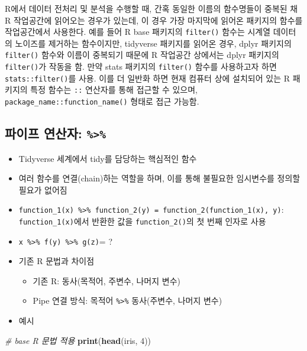 \documentclass[
  11pt,
]{krantz}
\newenvironment{Shaded}{\begin{snugshade}}{\end{snugshade}}
\newcommand{\CommentTok}[1]{\textcolor[rgb]{0.37,0.37,0.37}{\textit{#1}}}
\newcommand{\DecValTok}[1]{\textcolor[rgb]{0.06,0.06,0.06}{#1}}
\newcommand{\KeywordTok}[1]{\textcolor[rgb]{0.27,0.27,0.27}{\textbf{#1}}}
\newcommand{\NormalTok}[1]{#1}
\providecommand{\tightlist}{%
  \setlength{\itemsep}{0pt}\setlength{\parskip}{0pt}}
\let\BeginKnitrBlock\begin \let\EndKnitrBlock\end
\begin{document}
\footnotesize

\BeginKnitrBlock{rmdtip}
R에서 데이터 전처리 및 분석을 수행할 때, 간혹 동일한 이름의 함수명들이 중복된 채 R 작업공간에 읽어오는 경우가 있는데, 이 경우 가장 마지막에 읽어온 패키지의 함수를 작업공간에서 사용한다. 예를 들어 R base 패키지의 \texttt{filter()} 함수는 시계열 데이터의 노이즈를 제거하는 함수이지만, tidyverse 패키지를 읽어온 경우, dplyr 패키지의 \texttt{filter()} 함수와 이름이 중복되기 때문에 R 작업공간 상에서는 dplyr 패키지의 \texttt{filter()}가 작동을 함. 만약 stats 패키지의 \texttt{filter()} 함수를 사용하고자 하면 \texttt{stats::filter()}를 사용. 이를 더 일반화 하면 현재 컴퓨터 상에 설치되어 있는 R 패키지의 특정 함수는 \texttt{::} 연산자를 통해 접근할 수 있으며, \texttt{package\_name::function\_name()} 형태로 접근 가능함.
\EndKnitrBlock{rmdtip}

\normalsize

\hypertarget{pipe-op}{%
\subsection{\texorpdfstring{파이프 연산자: \texttt{\%\textgreater{}\%}}{파이프 연산자: \%\textgreater\%}}\label{pipe-op}}

\begin{itemize}
\item
  Tidyverse 세계에서 tidy를 담당하는 핵심적인 함수
\item
  여러 함수를 연결(chain)하는 역할을 하며, 이를 통해 불필요한 임시변수를 정의할 필요가 없어짐
\item
  \texttt{function\_1(x)\ \%\textgreater{}\%\ function\_2(y)\ =\ function\_2(function\_1(x),\ y)}: \texttt{function\_1(x)}에서 반환한 값을 \texttt{function\_2()}의 첫 번째 인자로 사용
\item
  \texttt{x\ \%\textgreater{}\%\ f(y)\ \%\textgreater{}\%\ g(z)}= ?
\item
  기존 R 문법과 차이점

  \begin{itemize}
  \tightlist
  \item
    기존 R: 동사(목적어, 주변수, 나머지 변수)
  \item
    Pipe 연결 방식: 목적어 \texttt{\%\textgreater{}\%} 동사(주변수, 나머지 변수)
  \end{itemize}
\item
  예시
\end{itemize}

\footnotesize

\begin{Shaded}
\begin{Highlighting}[]
\CommentTok{# base R 문법 적용}
\KeywordTok{print}\NormalTok{(}\KeywordTok{head}\NormalTok{(iris, }\DecValTok{4}\NormalTok{))}
\end{Highlighting}
\end{Shaded}
\end{document}
